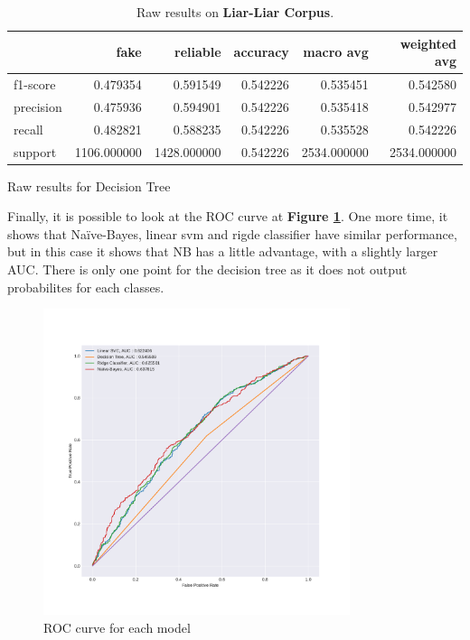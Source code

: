 \begin{table}
\begin{subtable}{\textwidth}
\begin{tabular}{lrrrrr}
\toprule
{} &         fake &     reliable &  accuracy &    macro avg &  weighted avg \\
\midrule
f1-score  &     0.479354 &     0.591549 &  0.542226 &     0.535451 &      0.542580 \\
precision &     0.475936 &     0.594901 &  0.542226 &     0.535418 &      0.542977 \\
recall    &     0.482821 &     0.588235 &  0.542226 &     0.535528 &      0.542226 \\
support   &  1106.000000 &  1428.000000 &  0.542226 &  2534.000000 &   2534.000000 \\
\bottomrule
\end{tabular}
\caption{Raw results for Decision Tree}
\end{subtable}
\caption{Raw results on \textbf{Liar-Liar Corpus}.}
\end{table}

Finally, it is possible to look at the ROC curve at \textbf{Figure \ref{fig:chap3:roc1}}. One more time, it shows that Na\"{i}ve-Bayes, linear svm and rigde classifier have similar performance, but in this case it shows that NB has a little advantage, with a slightly larger AUC. There is only one point for the decision tree as it does not output probabilites for each classes. \\

\begin{figure}
	\centering
	\includegraphics[width=0.8\textwidth]{images/chapitre3/roc1}
	\caption{ROC curve for each model}
	\label{fig:chap3:roc1}
\end{figure}

